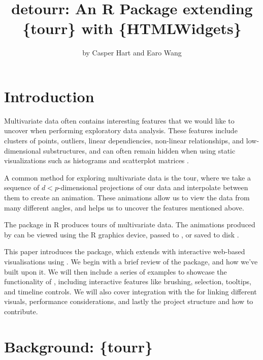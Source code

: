 \title{detourr: An R Package extending \{tourr\} with \{HTMLWidgets\}}
\author{by Casper Hart and Earo Wang}

\maketitle


\hypertarget{introduction}{%
\section{Introduction}\label{introduction}}

Multivariate data often contains interesting features that we would like
to uncover when performing exploratory data analysis. These features
include clusters of points, outliers, linear dependiencies, non-linear
relationships, and low-dimensional substructures, and can often remain
hidden when using static visualizations such as histograms and
scatterplot matrices \citep{tours}.

A common method for exploring multivariate data is the tour, where we
take a sequence of \(d < p\)-dimensional projections of our data and
interpolate between them to create an animation. These animations allow
us to view the data from many different angles, and helps us to uncover
the features mentioned above.

The  package in R produces tours of multivariate data.
The animations produced by  can be viewed using the R
graphics device, passed to \href{https://github.com/ggobi}{},
or saved to disk \citep{tourr2011}.

This paper introduces the  package, which extends
 with interactive web-based visualisations using
. We begin with a brief review of the
 package, and how we've built upon it. We will then
include a series of examples to showcase the functionality of
, including interactive features like brushing, selection,
tooltips, and timeline controls. We will also cover integration with the
 for linking different visuals, performance
considerations, and lastly the project structure and how to contribute.

\hypertarget{background-tourr}{%
\section{Background: \{tourr\}}\label{background-tourr}}

